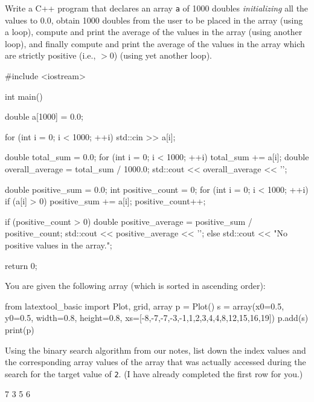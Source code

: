 

\nextq
Write a C++ program that declares an array \verb$a$ of
1000 doubles \textit{initializing} all the values to 0.0,
obtain 1000 doubles from the user to be placed in the array (using a loop),
compute and print the average of the values in the array (using another loop),
and finally compute and print the average of the values in the array which are
strictly positive (i.e., $> 0$) (using yet another loop).
\\
\ANSWER
\begin{answercode}
#include <iostream>

int main()
{
    double a[1000] = {0.0};

    for (int i = 0; i < 1000; ++i)
    {
        std::cin >> a[i];
    }

    double total_sum = 0.0;
    for (int i = 0; i < 1000; ++i)
    {
        total_sum += a[i];
    }
    double overall_average = total_sum / 1000.0;
    std::cout << overall_average << '\n';

    double positive_sum = 0.0;
    int positive_count = 0;
    for (int i = 0; i < 1000; ++i)
    {
        if (a[i] > 0)
        {
            positive_sum += a[i];
            positive_count++;
        }
    }

    if (positive_count > 0)
    {
        double positive_average = positive_sum / positive_count;
        std::cout << positive_average << '\n';
    }
    else
    {
        std::cout << "No positive values in the array.\n";
    }

    return 0;
}
\end{answercode}

\nextq
You are given the following array (which is sorted in ascending order):
\begin{python}
from latextool_basic import Plot, grid, array
p = Plot()
s = array(x0=0.5, y0=0.5, width=0.8, height=0.8,
          xs=[-8,-7,-7,-3,-1,1,2,3,4,4,8,12,15,16,19])
p.add(s)
print(p)
\end{python}
Using the binary search algorithm from our notes, list down the
index values and the corresponding array values of the array that was
actually accessed during the
search for the target value of \verb!2!.
(I have already completed the first row for you.)
\\
\ANSWER
\begin{answercode}
7 3 5 6
\end{answercode}

